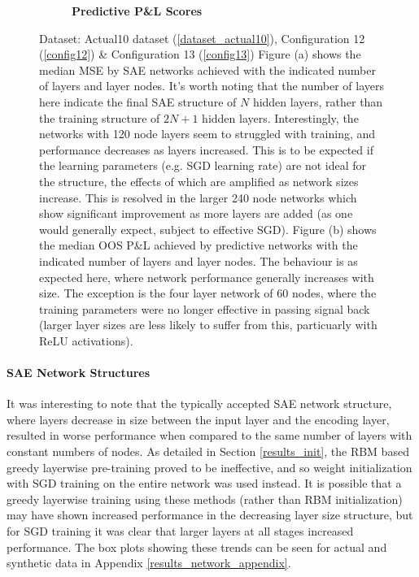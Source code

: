 \documentclass[a4paper,11pt,oneside]{article}
\theoremstyle{plain}
\theoremstyle{definition}
\begin{document}
\begin{figure}[H]
\begin{subfigure}{.5\textwidth}
			\caption{\textbf{Predictive P\&L Scores} 
				\newline }
			\label{figure-actual_pl_lines}
		\end{subfigure}
		\caption[Network Performance by Size]
		{Dataset: Actual10 dataset (\ref{dataset_actual10}), Configuration 12 (\ref{config12}) \& Configuration 13 (\ref{config13})
			\newline Figure (a) shows the median MSE by SAE networks achieved with the indicated number of layers and layer nodes. It's worth noting that the number of layers here indicate the final SAE structure of $N$ hidden layers, rather than the training structure of $2N + 1$ hidden layers. Interestingly, the networks with 120 node layers seem to struggled with training, and performance decreases as layers increased. This is to be expected if the learning parameters (e.g. SGD  learning rate) are not ideal for the structure, the effects of which are amplified as network sizes increase. This is resolved in the larger 240 node networks which show significant improvement as more layers are added (as one would generally expect, subject to effective SGD).
			\newline Figure (b) shows the median OOS P\&L achieved by predictive networks with the indicated number of layers and layer nodes. The behaviour is as expected here, where network performance generally increases with size. The exception is the four layer network of 60 nodes, where the training parameters were no longer effective in passing signal back (larger layer sizes are less likely to suffer from this, particuarly with ReLU activations).
		}
		\label{figure-network_size}
	\end{figure}
	
	\paragraph{SAE Network Structures}
	
	It was interesting to note that the typically accepted SAE network structure, where layers decrease in size between the input layer and the encoding layer, resulted in worse performance when compared to the same number of layers with constant numbers of nodes. As detailed in Section \ref{results_init}, the RBM based greedy layerwise pre-training proved to be ineffective, and so weight initialization with SGD training on the entire network was used instead. It is possible that a greedy layerwise training using these methods (rather than RBM initialization) may have shown increased performance in the decreasing layer size structure, but for SGD training it was clear that larger layers at all stages increased performance. The box plots showing these trends can be seen for actual and synthetic data in Appendix \ref{results_network_appendix}.
\end{document}
